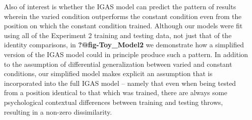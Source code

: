 \documentclass[
  12pt,
  letterpaper,
]{article}
\begin{document}
Also of interest is whether the IGAS model can predict the pattern of
results wherein the varied condition outperforms the constant condition
even from the position on which the constant condition trained. Although
our models were fit using all of the Experiment 2 training and testing
data, not just that of the identity comparisons, in
\textbf{?@fig-Toy\_Model2} we demonstrate how a simplified version of
the IGAS model could in principle produce such a pattern. In addition to
the assumption of differential generalization between varied and
constant conditions, our simplified model makes explicit an assumption
that is incorporated into the full IGAS model -- namely that even when
being tested from a position identical to that which was trained, there
are always some psychological contextual differences between training
and testing throws, resulting in a non-zero dissimilarity.
\end{document}
